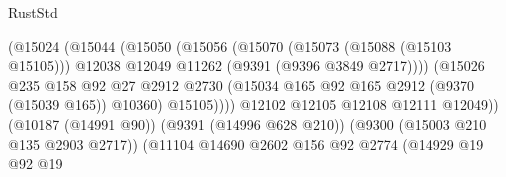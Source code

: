 \begin{lexlean}{RustStd}
\begin{coremodule}
                                                (@15024
                                                  (@15044
                                                    (@15050
                                                      (@15056
                                                        (@15070
                                                          (@15073 (@15088 (@15103 @15105)))
                                                          @12038
                                                          @12049
                                                          @11262
                                                          (@9391 (@9396 @3849 @2717))))
                                                      (@15026
                                                        @235
                                                        @158
                                                        @92
                                                        @27
                                                        @2912
                                                        @2730
                                                        (@15034
                                                          @165
                                                          @92
                                                          @165
                                                          @2912
                                                          (@9370 (@15039 @165))
                                                          @10360)
                                                        @15105))))
                                                @12102
                                                @12105
                                                @12108
                                                @12111
                                                @12049))
                                            (@10187 (@14991 @90))
                                            (@9391 (@14996 @628 @210))
                                            (@9300 (@15003 @210 @135 @2903 @2717))
                                            (@11104
                                              @14690
                                              @2602
                                              @156
                                              @92
                                              @2774
                                              (@14929
                                                @19
                                                @92
                                                @19

\end{coremodule}
\end{lexlean}
